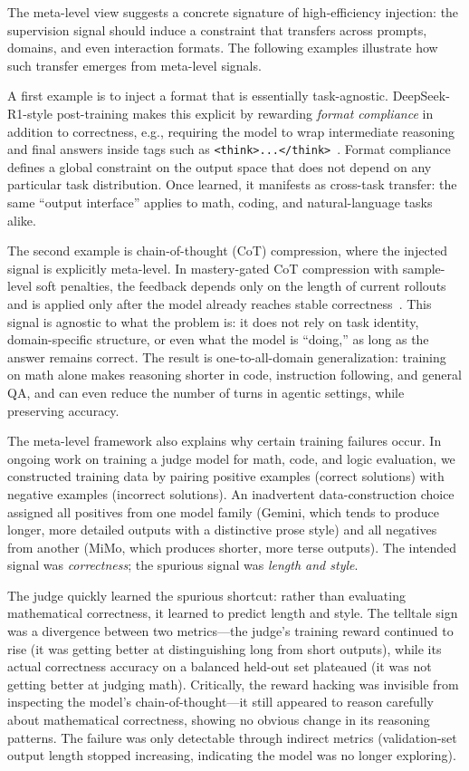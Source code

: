 \documentclass{article}
\theoremstyle{plain}
\theoremstyle{definition}
\theoremstyle{remark}
\begin{document}
The meta-level view suggests a concrete signature of high-efficiency injection: the supervision signal should induce a constraint that transfers across prompts, domains, and even interaction formats. The following examples illustrate how such transfer emerges from meta-level signals.

A first example is to inject a format that is essentially task-agnostic. DeepSeek-R1-style post-training makes this explicit by rewarding \textit{format compliance} in addition to correctness, e.g., requiring the model to wrap intermediate reasoning and final answers inside tags such as \texttt{<think>...</think>}~\cite{guoDeepSeekR1IncentivizesReasoning2025}. Format compliance defines a global constraint on the output space that does not depend on any particular task distribution. Once learned, it manifests as cross-task transfer: the same ``output interface'' applies to math, coding, and natural-language tasks alike.

The second example is chain-of-thought (CoT) compression, where the injected signal is explicitly meta-level. In mastery-gated CoT compression with sample-level soft penalties, the feedback depends only on the length of current rollouts and is applied only after the model already reaches stable correctness~\cite{liReinforcementLearningChain2026}. This signal is agnostic to what the problem is: it does not rely on task identity, domain-specific structure, or even what the model is ``doing,'' as long as the answer remains correct. The result is one-to-all-domain generalization: training on math alone makes reasoning shorter in code, instruction following, and general QA, and can even reduce the number of turns in agentic settings, while preserving accuracy.

The meta-level framework also explains why certain training failures occur. In ongoing work on training a judge model for math, code, and logic evaluation, we constructed training data by pairing positive examples (correct solutions) with negative examples (incorrect solutions). An inadvertent data-construction choice assigned all positives from one model family (Gemini, which tends to produce longer, more detailed outputs with a distinctive prose style) and all negatives from another (MiMo, which produces shorter, more terse outputs). The intended signal was \textit{correctness}; the spurious signal was \textit{length and style}.

The judge quickly learned the spurious shortcut: rather than evaluating mathematical correctness, it learned to predict length and style. The telltale sign was a divergence between two metrics---the judge's training reward continued to rise (it was getting better at distinguishing long from short outputs), while its actual correctness accuracy on a balanced held-out set plateaued (it was not getting better at judging math). Critically, the reward hacking was invisible from inspecting the model's chain-of-thought---it still appeared to reason carefully about mathematical correctness, showing no obvious change in its reasoning patterns. The failure was only detectable through indirect metrics (validation-set output length stopped increasing, indicating the model was no longer exploring).
\end{document}

